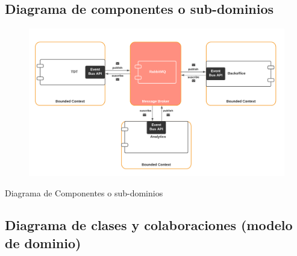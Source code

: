 \documentclass{article}
\begin{document}
\subsection{Diagrama de componentes o sub-dominios}

\begin{center}
\begin{figure}[h]
    \centering
    \includegraphics[scale=.3]{pics/dominios.png}%
    \label{fig:componente}\end{figure}
    \large{Diagrama de Componentes o sub-dominios}
\end{center}

\subsection{Diagrama de clases y colaboraciones (modelo de dominio)}
\end{document}
